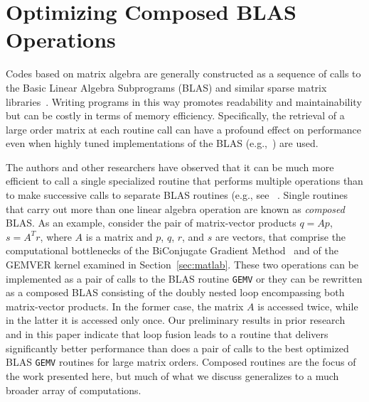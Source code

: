 \documentclass[runningheads]{llncs}
\begin{document}
\section{Optimizing Composed BLAS Operations}
\label{sec:approach}

Codes based on matrix algebra are generally constructed as a sequence of
calls to the Basic Linear Algebra Subprograms
(BLAS)
and similar
sparse matrix libraries~\cite{Saad:fr}.
Writing programs in
this way promotes readability and maintainability but can be costly in terms
of memory efficiency. Specifically, the retrieval of a large order matrix at
each routine call can have a profound effect on performance even when highly
tuned implementations of the BLAS (e.g.,~\cite{Goto:2006fk})
are used.

The authors and other researchers have observed that it can be much more
efficient to call a single specialized routine that performs multiple
operations than to make successive calls to separate BLAS routines (e.g., see
~\cite{gropp01}.
Single routines that carry out more than one linear algebra operation are
known as \emph{composed} BLAS. As an example, consider the pair of
matrix-vector products $q = Ap$, $s = A^Tr$, where $A$ is a matrix and $p$,
$q$, $r$, and $s$ are vectors, that comprise the computational bottlenecks of
the BiConjugate Gradient Method~\cite{Saad:2003fk} and of the
GEMVER kernel examined in Section~\ref{sec:matlab}.  These two operations can
be implemented as a pair of calls to the BLAS routine {\tt GEMV} or they can
be rewritten as a composed BLAS consisting of the doubly nested loop
encompassing both matrix-vector products. In the former case, the matrix
$A$ is accessed twice, while in the latter it is accessed only once. Our
preliminary results in prior research and in this paper indicate that 
loop fusion leads to a routine that delivers significantly better performance
than does a pair of calls to the best optimized BLAS {\tt GEMV} routines for
large matrix orders.  Composed routines are the focus of the work presented
here, but much of what we discuss generalizes to a much broader array of
computations.
\end{document}
